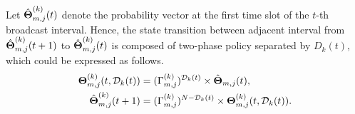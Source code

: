 \begin{definition}
    Let $\hat{\boldsymbol{\Theta}}^{(k)}_{m,j}(t)$ denote the probability vector at the first time slot of the $t$-th broadcast interval.
    Hence, the state transition between adjacent interval from $\hat{\boldsymbol{\Theta}}^{(k)}_{m,j}(t+1)$ to $\hat{\boldsymbol{\Theta}}^{(k)}_{m,j}(t)$ is composed of two-phase policy separated by $D_k(t)$, which could be expressed as follows.
    \begin{align}
        \boldsymbol{\Theta}^{(k)}_{m,j}(t, \mathcal{D}_{k}(t)) &= (\Gamma^{(k)}_{m,j})^{\mathcal{D}_{k}(t)} \times \hat{\boldsymbol{\Theta}}_{m,j}(t),
        \nonumber\\
        \hat{\boldsymbol{\Theta}}^{(k)}_{m,j}(t+1) &= (\Gamma^{(k)}_{m,j})^{N-\mathcal{D}_{k}(t)} \times \boldsymbol{\Theta}^{(k)}_{m,j}(t, \mathcal{D}_{k}(t)).
    \end{align}
\end{definition}

